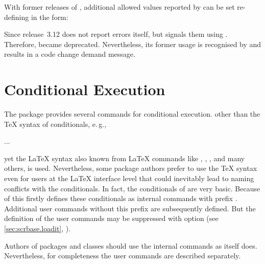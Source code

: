 \begin{Declaration}
\end{Declaration}
%
With former releases of ,
additional allowed values reported by  can be
set re-defining  in the form:
Since release~3.12  does not report errors itself,
but signals them using . Therefore,
 became deprecated. Nevertheless, its former usage is
recognised by  and results in a code change demand message.%
%


\section{Conditional Execution}
\label{sec:scrbase.if}

The package  provides several commands for conditional
execution. other than the \TeX{} syntax of conditionals, e.\,g.,
\begin{lstcode}[belowskip=\dp\strutbox]
  \iftrue
    ...
  \else
    ...
  \fi
\end{lstcode}
yet the \LaTeX{} syntax also known from \LaTeX{} commands like
, , , and many
others, is used. Nevertheless, some package authors prefer to use the \TeX{}
syntax even for users at the \LaTeX{} interface level that could inevitably
lead to naming conflicts with the  conditionals. In fact, the
conditionals of  are very basic. Because of this
 firstly defines these conditionals as internal commands with
prefix . Additional user commands without this prefix are
subsequently defined. But the definition of the user commands may be
suppressed with option  (see
\autoref{sec:scrbase.loadit}, ).

Authors of packages and classes should use the internal commands as
\KOMAScript{} itself does. Nevertheless, for completeness the user commands
are described separately.


